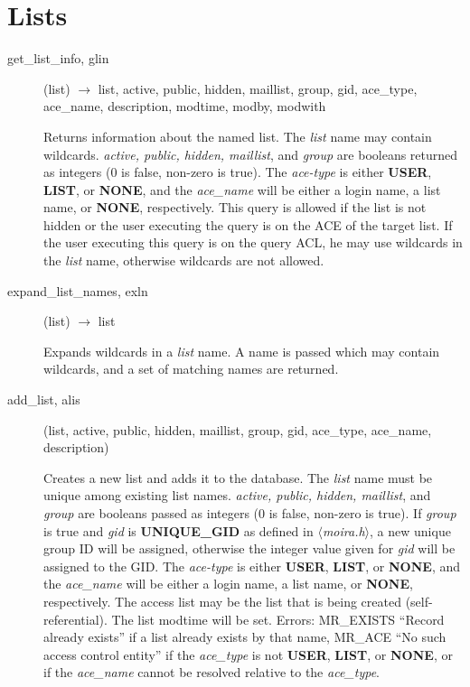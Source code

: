 \section{Lists}

\begin{description}

\item[get\_list\_info, glin](list) $\rightarrow$ list, active, public, hidden,
maillist, group, gid, ace\_type, ace\_name, description, modtime, modby,
modwith

Returns information about the named list.  The {\em list} name may
contain wildcards.  {\em active, public, hidden, maillist}, and
{\em group} are booleans returned as integers (0 is false, non-zero is
true).  The {\em ace-type} is either {\bf USER}, {\bf LIST}, or {\bf NONE},
and the {\em ace\_name} will be either a login name, a list name, or
{\bf NONE}, respectively.  This query is allowed if the list is not
hidden or the user executing the query is on the ACE of the target
list.  If the user executing this query is on the query ACL, he may
use wildcards in the {\em list} name, otherwise wildcards are not
allowed.

\item[expand\_list\_names, exln](list) $\rightarrow$ list

Expands wildcards in a {\em list} name.  A name is passed which may
contain wildcards, and a set of matching names are returned.

\item[add\_list, alis](list, active, public, hidden, maillist, group, gid,
ace\_type, ace\_name, description)

Creates a new list and adds it to the database. The {\em list} name
must be unique among existing list names. {\em active, public, hidden,
maillist}, and {\em group} are booleans passed as integers (0 is
false, non-zero is true). If {\em group} is true and {\em gid} is {\bf
UNIQUE\_GID} as defined in {\em $\langle$moira.h$\rangle$}, a new
unique group ID will be assigned, otherwise the integer value given
for {\em gid} will be assigned to the GID. The {\em ace-type} is
either {\bf USER}, {\bf LIST}, or {\bf NONE}, and the {\em ace\_name}
will be either a login name, a list name, or {\bf NONE}, respectively.
The access list may be the list that is being created
(self-referential). The list modtime will be set. Errors: MR\_EXISTS
``Record already exists'' if a list already exists by that name, MR\_ACE
``No such access control entity'' if the {\em ace\_type} is not {\bf
USER}, {\bf LIST}, or {\bf NONE}, or if the {\em ace\_name} cannot be
resolved relative to the {\em ace\_type}.


\end{description}
